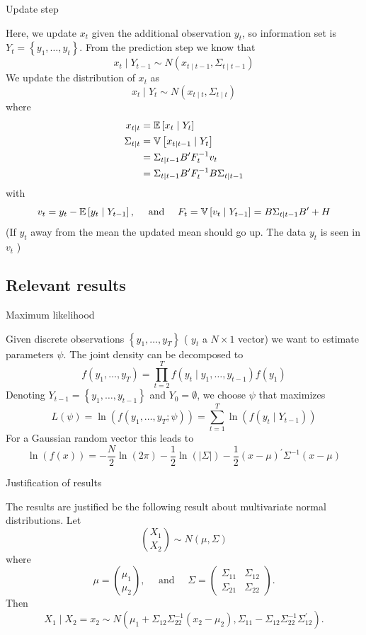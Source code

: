 \begin{description}
\item[Update step] 
\end{description}
 Here, we update $x_{t}$ given the additional observation $y_{t}$, so information set is
 $Y_{t}=\left\{y_{1}, \ldots, y_{t}\right\}$. From the prediction step we know that
\[
x_{t} \mid Y_{t-1} \sim N\left(x_{t \mid t-1}, \Sigma_{t \mid t-1}\right)
\]
We update the distribution of $x_{t}$ as
\[
x_{t} \mid Y_{t} \sim N\left(x_{t \mid t}, \Sigma_{t \mid t}\right)
\]
where
\begin{align*}
x_{t \mid t} & =\mathbb{E}\left[x_{t} \mid Y_{t}\right] \\
\Sigma_{t \mid t} & =\mathbb{V}\left[x_{t \mid t-1} \mid Y_{t}\right] \\
& =\Sigma_{t \mid t-1} B^{\prime} F_{t}^{-1} v_{t} \\
& =\Sigma_{t \mid t-1} B^{\prime} F_{t}^{-1} B \Sigma_{t \mid t-1}
\end{align*}
with
\[
v_{t}=y_{t}-\mathbb{E}\left[y_{t} \mid Y_{t-1}\right], \quad \text { and } \quad F_{t}=\mathbb{V}\left[v_{t} \mid Y_{t-1}\right]=B \Sigma_{t \mid t-1} B^{\prime}+H
\]
(If $y_{t}$ away from the mean the updated mean should go up. The data $y_{t}$ is seen in $v_{t}$ )

\subsection{Relevant results}

\begin{description}
\item[Maximum likelihood] 
\end{description}
 Given discrete observations $\left\{y_{1}, \ldots, y_{T}\right\}$ ( $y_{t}$ a $N \times 1$ vector)
 we want to estimate parameters $\psi$. The joint density can be decomposed to
\[
f\left(y_{1}, \ldots, y_{T}\right)=\prod_{t=2}^{T} f\left(y_{t} \mid y_{1}, \ldots, y_{t-1}\right) f\left(y_{1}\right)
\]
Denoting $Y_{t-1}=\left\{y_{1}, \ldots, y_{t-1}\right\}$ and $Y_{0}=\emptyset$, we choose $\psi$
that maximizes
\[
L(\psi)=\ln \left(f\left(y_{1}, \ldots, y_{T} ; \psi\right)\right)=\sum_{t=1}^{T} \ln \left(f\left(y_{t} \mid Y_{t-1}\right)\right)
\]
For a Gaussian random vector this leads to
\[
\ln (f(x))=-\frac{N}{2} \ln (2 \pi)-\frac{1}{2} \ln (|\Sigma|)-\frac{1}{2}(x-\mu)^{\prime} \Sigma^{-1}(x-\mu)
\]

\begin{description}
\item[Justification of results] 
\end{description}
 The results are justified be the following result about multivariate normal distributions. Let
\[
\binom{X_{1}}{X_{2}} \sim N(\mu, \Sigma)
\]
where
\[
\mu=\binom{\mu_{1}}{\mu_{2}}, \quad \text { and } \quad \Sigma=\left(\begin{array}{cc}
\Sigma_{11} & \Sigma_{12} \\
\Sigma_{21} & \Sigma_{22}
\end{array}\right) .
\]
Then
\[
X_{1} \mid X_{2}=x_{2} \sim N\left(\mu_{1}+\Sigma_{12} \Sigma_{22}^{-1}\left(x_{2}-\mu_{2}\right), \Sigma_{11}-\Sigma_{12} \Sigma_{22}^{-1} \Sigma_{12}^{\prime}\right) .
\]

